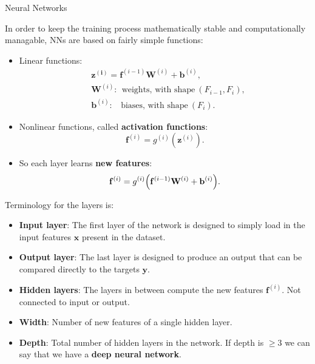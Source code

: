 \documentclass[12pt,t]{beamer}
\begin{document}
\begin{frame}{Neural Networks}


In order to keep the training process mathematically stable and computationally managable, NNs are based on fairly simple functions:
\begin{itemize}
\item Linear functions:
\begin{equation*} \begin{split}
&  \mathbf{z^{(i)}} = \mathbf{f}^{(i-1)} \mathbf{W}^{(i)} + \mathbf{b}^{(i)}, \\
&  \mathbf{W}^{(i)}: ~~\text{weights, with shape}~(F_{i-1}, F_i), \\
&   \mathbf{b}^{(i)}:~~~~\text{biases, with shape}~( F_i).
\end{split} \end{equation*}
\item Nonlinear functions, called {\bf activation functions}:
$$ \mathbf{f}^{(i)} = g^{(i)}(\mathbf{z}^{(i)}).$$
\item So each layer learns {\bf new features}:
$$ \mathbf{f}^{(i)} = g^{(i)} \Bigl(\mathbf{f}^{(i-1)} \mathbf{W}^{(i)} + \mathbf{b}^{(i)}\Bigr).$$
\end{itemize}
\end{frame}

\begin{frame}

Terminology for the layers is:
\begin{itemize}
\item {\bf Input layer}: The first layer of the network is designed to simply load in the input features $\mathbf{x}$ present in the dataset.
\item {\bf Output layer}: The last layer is designed to produce an output that can be compared directly to the targets $\mathbf{y}$.
\item {\bf Hidden layers}: The layers in between compute the new features $\mathbf{f}^{(i)}$.  Not connected to input or output. 
\item {\bf Width}: Number of new features of a single hidden layer. 
\item {\bf Depth}: Total number of hidden layers in the network.  If depth is $\geq 3$ we can say that we have a {\bf deep neural network}.
\end{itemize}
\end{frame}
\end{document}
